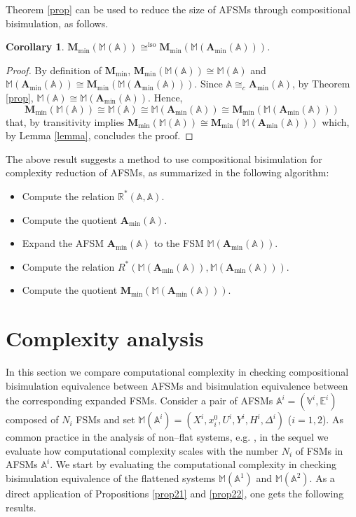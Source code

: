 \documentclass{amsart}
\newtheorem{corollary}[theorem]{Corollary}
\theoremstyle{definition}
\theoremstyle{remark}
\numberwithin{equation}{section}
\newcommand{\iso}{\mathrm{iso}}
\begin{document}
Theorem \ref{prop} can be used to reduce the size of AFSMs through compositional bisimulation, as follows. 
\begin{corollary}
\label{coro}
$\mathbf{M}_{\min}(\mathbb{M}(\mathbb{A})) \cong^{\iso} \mathbf{M}_{\min}(\mathbb{M}(\mathbf{A}_{\min}(\mathbb{A})))$.
\end{corollary}
\begin{proof}
By definition of $\mathbf{M}_{\min}$, $\mathbf{M}_{\min}(\mathbb{M}(\mathbb{A})) \cong \mathbb{M}(\mathbb{A})$ and $\mathbb{M}(\mathbf{A}_{\min}(\mathbb{A}))\cong \mathbf{M}_{\min}(\mathbb{M}(\mathbf{A}_{\min}(\mathbb{A})))$. Since $\mathbb{A}\cong_{c} \mathbf{A}_{\min}(\mathbb{A})$, by Theorem \ref{prop}, $\mathbb{M}(\mathbb{A}) \cong \mathbb{M}(\mathbf{A}_{\min}(\mathbb{A}))$.  
Hence,
\[
\mathbf{M}_{\min}(\mathbb{M}(\mathbb{A})) \cong \mathbb{M}(\mathbb{A}) \cong \mathbb{M}(\mathbf{A}_{\min}(\mathbb{A})) 
\cong \mathbf{M}_{\min}(\mathbb{M}(\mathbf{A}_{\min}(\mathbb{A})))
\]
that, by transitivity implies 
$\mathbf{M}_{\min}(\mathbb{M}(\mathbb{A})) \cong \mathbf{M}_{\min}(\mathbb{M}(\mathbf{A}_{\min}(\mathbb{A})))$ 
which, by Lemma \ref{lemma}, concludes the proof.
\end{proof}

The above result suggests a method to use compositional bisimulation for complexity reduction of AFSMs, as summarized in the following algorithm:
\begin{itemize}
\item Compute the relation $\mathbb{R}^{\ast}(\mathbb{A},\mathbb{A})$.
\item Compute the quotient $\mathbf{A}_{\min}(\mathbb{A})$.
\item Expand the AFSM $\mathbf{A}_{\min}(\mathbb{A})$ to the FSM $\mathbb{M}(\mathbf{A}_{\min}(\mathbb{A}))$.
\item Compute the relation $R^{\ast}(\mathbb{M}(\mathbf{A}_{\min}(\mathbb{A})),\mathbb{M}(\mathbf{A}_{\min}(\mathbb{A})))$.
\item Compute the quotient $\mathbf{M}_{\min}(\mathbb{M}(\mathbf{A}_{\min}(\mathbb{A})))$. \end{itemize}

\section{Complexity analysis}

In this section we compare computational complexity in checking compositional bisimulation equivalence between AFSMs and bisimulation equivalence between the corresponding expanded FSMs. Consider a pair of AFSMs $\mathbb{A}^{i}=(\mathbb{V}^{i},\mathbb{E}^{i})$ composed of $N_{i}$ FSMs and set $\mathbb{M}(\mathbb{A}^{i})=(X^{i},x^{0}_{i},U^{i},Y^{i},H^{i},\Delta^{i})$ ($i=1,2$). As common practice in the analysis of non--flat systems, e.g. \cite{StateExplosion2,StateExplosion1}, in the sequel we evaluate how computational complexity scales with the number $N_{i}$ of FSMs in AFSMs $\mathbb{A}^{i}$. 
We start by evaluating the computational complexity in checking bisimulation equivalence of the flattened systems $\mathbb{M}(\mathbb{A}^{1})$ and $\mathbb{M}(\mathbb{A}^{2})$. As a direct application of Propositions \ref{prop21} and \ref{prop22}, one gets the following results.
\end{document}
